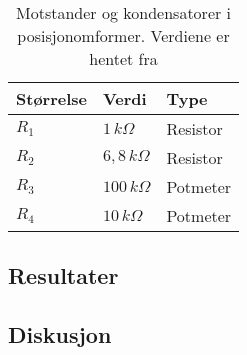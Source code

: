 \begin{table}[h]
    \centering
    \caption{Motstander og kondensatorer i posisjonomformer. Verdiene er hentet fra \cite{AnalogMotorlabbOppgaver}}
    \begin{tabular}{lll}
        \toprule
        Størrelse & Verdi & Type \\
		\midrule
        $R_1$ & $1\,k\Omega$ & Resistor\\
        $R_2$ & $6,8\,k\Omega$ & Resistor \\
        $R_3$ & $100\,k\Omega$ & Potmeter \\
        $R_4$ & $10\,k\Omega$ & Potmeter \\
        \bottomrule
    \end{tabular}
    \label{tab:Komponenter_i_posisjonsmaler}
\end{table}

\subsection{Resultater}
\subsection{Diskusjon}
